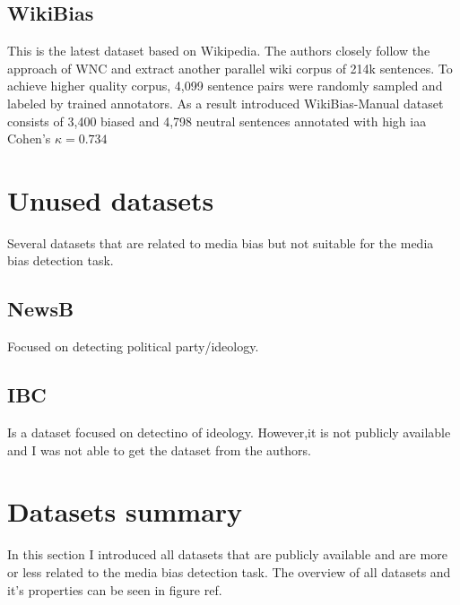 \subsection{WikiBias}
This is the latest dataset based on Wikipedia. The authors closely follow the approach of WNC \cite{pryzant2020automatically} and extract another parallel wiki corpus of 214k sentences.
To achieve higher quality corpus, 4,099 sentence pairs were randomly sampled and labeled by trained annotators. As a result introduced WikiBias-Manual dataset consists of 3,400 biased and 4,798 neutral sentences annotated with high \gls{iaa} Cohen's $\kappa = 0.734$




\section{Unused datasets}
Several datasets that are related to media bias but not suitable for the media bias detection task.



\subsection{NewsB}
Focused on detecting political party/ideology.




\subsection{IBC}
Is a dataset focused on detectino of ideology. However,it is not publicly available and I was not able to get the dataset from the authors.


\section{Datasets summary}
In this section I introduced all datasets that are publicly available and are more or less related to the media bias detection task. The overview of all datasets and it's properties can be seen in figure ref.
